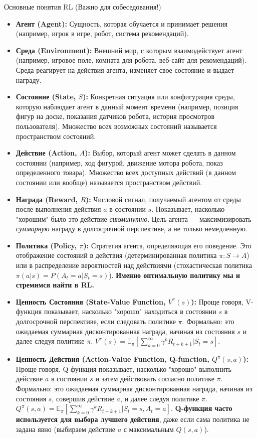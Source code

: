\begin{textbox}{Основные понятия RL (Важно для собеседования!)}
    \begin{itemize}
        \item \textbf{Агент (Agent):} Сущность, которая обучается и принимает решения (например, игрок в игре, робот, система рекомендаций).
        \item \textbf{Среда (Environment):} Внешний мир, с которым взаимодействует агент (например, игровое поле, комната для робота, веб-сайт для рекомендаций). Среда реагирует на действия агента, изменяет свое состояние и выдает награду.
        \item \textbf{Состояние (State, $S$):} Конкретная ситуация или конфигурация среды, которую наблюдает агент в данный момент времени (например, позиция фигур на доске, показания датчиков робота, история просмотров пользователя). Множество всех возможных состояний называется пространством состояний.
        \item \textbf{Действие (Action, $A$):} Выбор, который агент может сделать в данном состоянии (например, ход фигурой, движение мотора робота, показ определенного товара). Множество всех доступных действий (в данном состоянии или вообще) называется пространством действий.
        \item \textbf{Награда (Reward, $R$):} Числовой сигнал, получаемый агентом от среды после выполнения действия $a$ в состоянии $s$. Показывает, насколько "хорошим" было это действие \textit{сиюминутно}. Цель агента — максимизировать \textit{суммарную} награду в долгосрочной перспективе, а не только немедленную.
        \item \textbf{Политика (Policy, $\pi$):} Стратегия агента, определяющая его поведение. Это отображение состояний в действия (детерминированная политика $\pi: S \to A$) или в распределение вероятностей над действиями (стохастическая политика $\pi(a|s) = P(A_t = a | S_t = s)$). \textbf{Именно оптимальную политику мы и стремимся найти в RL.}
        \item \textbf{Ценность Состояния (State-Value Function, $V^\pi(s)$):} Проще говоря, V-функция показывает, насколько "хорошо" находиться в состоянии $s$ в долгосрочной перспективе, если следовать политике $\pi$. Формально: это ожидаемая суммарная дисконтированная награда, начиная из состояния $s$ и далее следуя политике $\pi$. $V^\pi(s) = \mathbb{E}_\pi \left[ \sum_{k=0}^{\infty} \gamma^k R_{t+k+1} | S_t = s \right]$.
        \item \textbf{Ценность Действия (Action-Value Function, Q-function, $Q^\pi(s, a)$):} Проще говоря, Q-функция показывает, насколько "хорошо" выполнить действие $a$ в состоянии $s$ и затем действовать согласно политике $\pi$. Формально: это ожидаемая суммарная дисконтированная награда, начиная из состояния $s$, совершив действие $a$, и далее следуя политике $\pi$. $Q^\pi(s, a) = \mathbb{E}_\pi \left[ \sum_{k=0}^{\infty} \gamma^k R_{t+k+1} | S_t = s, A_t = a \right]$. \textbf{Q-функция часто используется для выбора лучшего действия}, даже если сама политика не задана явно (выбираем действие $a$ с максимальным $Q(s,a)$).

\end{itemize}
\end{textbox}
